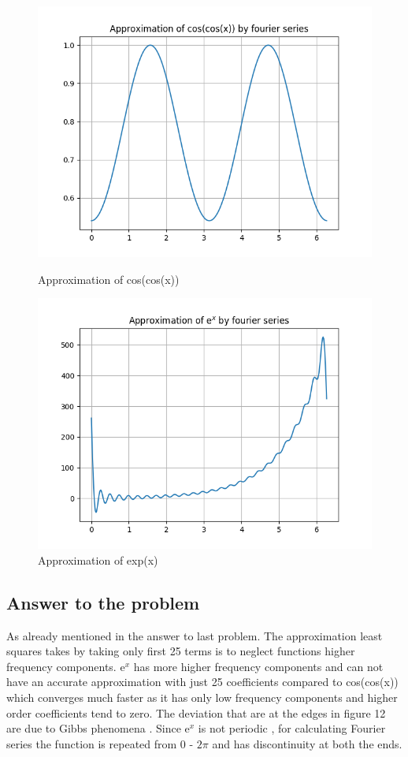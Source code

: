 \documentclass[a4paper]{article}
\begin{document}
\begin{figure}
\includegraphics[width=\columnwidth]{approxcoscos.png}
\caption{Approximation of cos(cos(x))}
\includegraphics[width=\columnwidth]{approxexpx.png}
\caption{Approximation of exp(x)}
\end{figure}
\subsection{Answer to the problem}
As already mentioned in the answer to last problem. The approximation least squares takes by taking only first 25 terms is to neglect functions higher frequency components. e$^{x}$ has more higher frequency components and can not have an accurate approximation with just 25 coefficients compared to cos(cos(x)) which converges much faster as it has only low frequency components and higher order coefficients tend to zero. The deviation that are at the edges in figure 12 are due to Gibbs phenomena . Since e$^{x}$ is not periodic , for calculating Fourier series the function is repeated from 0 - $2\pi$ and has discontinuity at both the ends.
\end{document}
